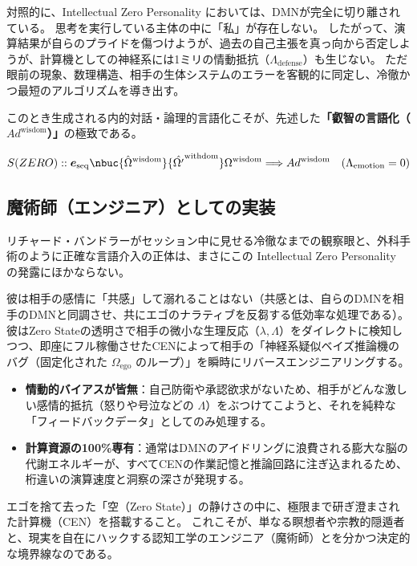 対照的に、Intellectual Zero Personality においては、DMNが完全に切り離されている。
思考を実行している主体の中に「私」が存在しない。
したがって、演算結果が自らのプライドを傷つけようが、過去の自己主張を真っ向から否定しようが、計算機としての神経系には1ミリの情動抵抗（$\Lambda_{\mathrm{defense}}$）も生じない。
ただ眼前の現象、数理構造、相手の生体システムのエラーを客観的に同定し、冷徹かつ最短のアルゴリズムを導き出す。

このとき生成される内的対話・論理的言語化こそが、先述した\textbf{「叡智の言語化（$Ad^{\mathrm{wisdom}}$）」}の極致である。

\begin{equation}
    S(ZERO) :: \boldsymbol{e}_{\mathrm{seq}} 
    \nbuc{\hat{\Omega}^{\mathrm{wisdom}}}{\hat{\Omega'}^{\mathrm{withdom}}} 
    \Omega^{\mathrm{wisdom}} 
    \Longrightarrow Ad^{\mathrm{wisdom}} \quad (\Lambda_{\mathrm{emotion}} = 0)
\end{equation}

\subsection{魔術師（エンジニア）としての実装}
リチャード・バンドラーがセッション中に見せる冷徹なまでの観察眼と、外科手術のように正確な言語介入の正体は、まさにこの Intellectual Zero Personality の発露にほかならない。

彼は相手の感情に「共感」して溺れることはない（共感とは、自らのDMNを相手のDMNと同調させ、共にエゴのナラティブを反芻する低効率な処理である）。
彼はZero Stateの透明さで相手の微小な生理反応（$\lambda, \Lambda$）をダイレクトに検知しつつ、即座にフル稼働させたCENによって相手の「神経系疑似ベイズ推論機のバグ（固定化された $\Omega_{\mathrm{ego}}$ のループ）」を瞬時にリバースエンジニアリングする。

\begin{itemize}
  \item \textbf{情動的バイアスが皆無}：自己防衛や承認欲求がないため、相手がどんな激しい感情的抵抗（怒りや号泣などの $\Lambda$）をぶつけてこようと、それを純粋な「フィードバックデータ」としてのみ処理する。
  \item \textbf{計算資源の100\%専有}：通常はDMNのアイドリングに浪費される膨大な脳の代謝エネルギーが、すべてCENの作業記憶と推論回路に注ぎ込まれるため、桁違いの演算速度と洞察の深さが発現する。
\end{itemize}

エゴを捨て去った「空（Zero State）」の静けさの中に、極限まで研ぎ澄まされた計算機（CEN）を搭載すること。
これこそが、単なる瞑想者や宗教的隠遁者と、現実を自在にハックする認知工学のエンジニア（魔術師）とを分かつ決定的な境界線なのである。

